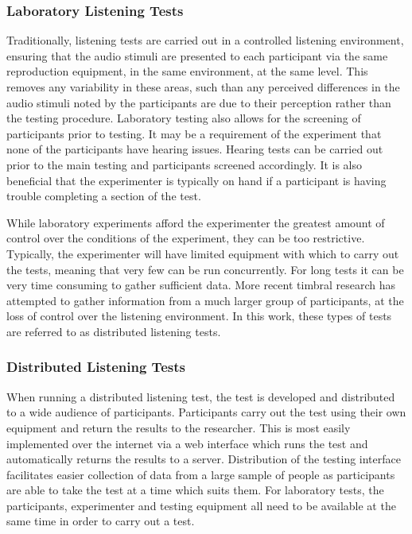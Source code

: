 		\subsubsection*{Laboratory Listening Tests}
			Traditionally, listening tests are carried out in a controlled listening environment, ensuring that
			the audio stimuli are presented to each participant via the same reproduction equipment, in the
			same environment, at the same level. This removes any variability in these areas, such than any
			perceived differences in the audio stimuli noted by the participants are due to their perception
			rather than the testing procedure. Laboratory testing also allows for the screening of participants
			prior to testing. It may be a requirement of the experiment that none of the participants have
			hearing issues. Hearing tests can be carried out prior to the main testing and participants
			screened accordingly. It is also beneficial that the experimenter is typically on hand if a
			participant is having trouble completing a section of the test.

			While laboratory experiments afford the experimenter the greatest amount of control over the
			conditions of the experiment, they can be too restrictive. Typically, the experimenter will have
			limited equipment with which to carry out the tests, meaning that very few can be run concurrently.
			For long tests it can be very time consuming to gather sufficient data. More recent timbral
			research has attempted to gather information from a much larger group of participants, at the loss
			of control over the listening environment. In this work, these types of tests are referred to as
			distributed listening tests.

		\subsubsection*{Distributed Listening Tests}
			When running a distributed listening test, the test is developed and distributed to a wide audience
			of participants. Participants carry out the test using their own equipment and return the results
			to the researcher. This is most easily implemented over the internet via a web interface which runs
			the test and automatically returns the results to a server. Distribution of the testing interface
			facilitates easier collection of data from a large sample of people as participants are able to
			take the test at a time which suits them. For laboratory tests, the participants, experimenter and
			testing equipment all need to be available at the same time in order to carry out a test.

